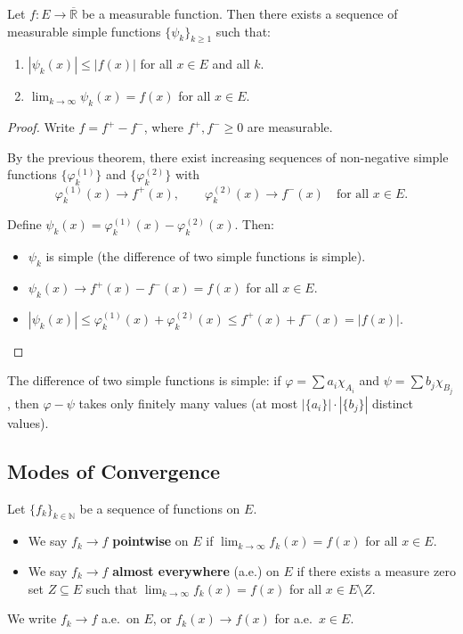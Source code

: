 \documentclass[11pt]{report}
\begin{document}
\begin{thmbox}
Let $f: E \to \overline{\mathbb{R}}$ be a measurable function. Then there exists a sequence of measurable simple functions $\{\psi_k\}_{k \geq 1}$ such that:
\begin{enumerate}
    \item $|\psi_k(x)| \leq |f(x)|$ for all $x \in E$ and all $k$.
    \item $\displaystyle\lim_{k \to \infty} \psi_k(x) = f(x)$ for all $x \in E$.
\end{enumerate}
\end{thmbox}

\begin{proof}
Write $f = f^+ - f^-$, where $f^+, f^- \geq 0$ are measurable.

By the previous theorem, there exist increasing sequences of non-negative simple functions $\{\varphi_k^{(1)}\}$ and $\{\varphi_k^{(2)}\}$ with
\[
\varphi_k^{(1)}(x) \to f^+(x), \qquad \varphi_k^{(2)}(x) \to f^-(x) \quad \text{for all } x \in E.
\]

Define $\psi_k(x) = \varphi_k^{(1)}(x) - \varphi_k^{(2)}(x)$. Then:
\begin{itemize}
    \item $\psi_k$ is simple (the difference of two simple functions is simple).
    \item $\psi_k(x) \to f^+(x) - f^-(x) = f(x)$ for all $x \in E$.
    \item $|\psi_k(x)| \leq \varphi_k^{(1)}(x) + \varphi_k^{(2)}(x) \leq f^+(x) + f^-(x) = |f(x)|$.
\end{itemize}
\end{proof}

\begin{rembox}
The difference of two simple functions is simple: if $\varphi = \sum a_i \chi_{A_i}$ and $\psi = \sum b_j \chi_{B_j}$, then $\varphi - \psi$ takes only finitely many values (at most $|\{a_i\}| \cdot |\{b_j\}|$ distinct values).
\end{rembox}

\subsection{Modes of Convergence}

\begin{defbox}
Let $\{f_k\}_{k \in \mathbb{N}}$ be a sequence of functions on $E$.
\begin{itemize}
    \item We say $f_k \to f$ \textbf{pointwise} on $E$ if $\displaystyle\lim_{k \to \infty} f_k(x) = f(x)$ for all $x \in E$.
    \item We say $f_k \to f$ \textbf{almost everywhere} (a.e.) on $E$ if there exists a measure zero set $Z \subseteq E$ such that $\displaystyle\lim_{k \to \infty} f_k(x) = f(x)$ for all $x \in E \setminus Z$.
\end{itemize}
We write $f_k \to f$ a.e.\ on $E$, or $f_k(x) \to f(x)$ for a.e.\ $x \in E$.
\end{defbox}
\end{document}
